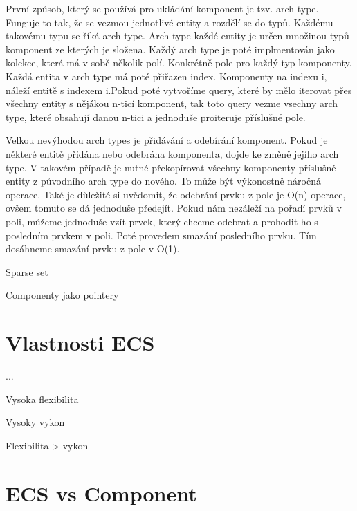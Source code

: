 První způsob, který se používá pro ukládání komponent je tzv. arch type. Funguje to tak, že se vezmou jednotlivé entity a rozdělí se do typů. Každému takovému typu se říká arch type. Arch type každé entity je určen množinou typů komponent ze kterých je složena. Každý arch type je poté implmentován jako kolekce, která má v sobě několik polí. Konkrétně pole pro každý typ komponenty. Každá entita v arch type má poté přiřazen index. Komponenty na indexu i, náleží entitě s indexem i.Pokud poté vytvoříme query, které by mělo iterovat přes všechny entity s nějákou n-ticí komponent, tak toto query vezme vsechny arch type, které obsahují danou n-tici a jednoduše proiteruje příslušné pole.

Velkou nevýhodou arch types je přidávání a odebírání komponent. Pokud je některé entitě přidána nebo odebrána komponenta, dojde ke změně jejího arch type. V takovém případě je nutné překopírovat všechny komponenty příslušné entity z původního arch type do nového. To může být výkonostně náročná operace. Také je důležité si uvědomit, že odebrání prvku z pole je O(n) operace, ovšem tomuto se dá jednoduše předejít. Pokud nám nezáleží na pořadí prvků v poli, můžeme jednoduše vzít prvek, který chceme odebrat a prohodit ho s posledním prvkem v poli. Poté provedem smazání posledního prvku. Tím dosáhneme smazání prvku z pole v O(1).

Sparse set

Componenty jako pointery

\section{Vlastnosti ECS}
...

Vysoka flexibilita

Vysoky vykon

Flexibilita > vykon

\section{ECS vs Component}


